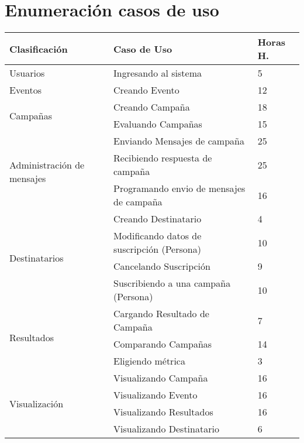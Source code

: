 \documentclass[a4paper, 11pt]{article}
\begin{document}
\newpage
\section{Enumeraci\'on casos de uso}


\begin{table}[H]
\centering
\begin{tabular}{ | p{5cm} | p{8cm} | p{1.5cm} | }
\hline
Clasificación & Caso de Uso & Horas H.\\ \hline \hline
Usuarios & Ingresando al sistema & 5 \\ \hline
Eventos & Creando Evento & 12 \\ \hline
\multirow{2}{5cm}{Campañas} & Creando Campaña & 18 \\ \cline{2-3} 
& Evaluando Campañas & 15 \\ \hline
\multirow{3}{5cm}{Administración de mensajes} & Enviando Mensajes de campaña & 25 \\ \cline{2-3} 
& Recibiendo respuesta de campaña & 25 \\ \cline{2-3} 
& Programando envio de mensajes de campaña & 16 \\ \hline
\multirow{4}{5cm}{Destinatarios} & Creando Destinatario & 4 \\  \cline{2-3} 
& Modificando datos de suscripci\'on (Persona) & 10 \\ \cline{2-3} 
& Cancelando Suscripci\'on & 9 \\ \cline{2-3} 
& Suscribiendo a una campaña (Persona) & 10 \\ \hline 
\multirow{3}{5cm}{Resultados} & Cargando Resultado de Campaña & 7 \\ \cline{2-3} 
& Comparando Campañas & 14 \\ \cline{2-3} 
& Eligiendo métrica & 3 \\ \hline
\multirow{4}{5cm}{Visualización} & Visualizando Campaña & 16 \\ \cline{2-3} 
& Visualizando Evento & 16 \\ \cline{2-3} 
& Visualizando Resultados & 16 \\ \cline{2-3} 
& Visualizando Destinatario & 6 \\ \hline

\end{tabular}
\end{table}
\end{document}
